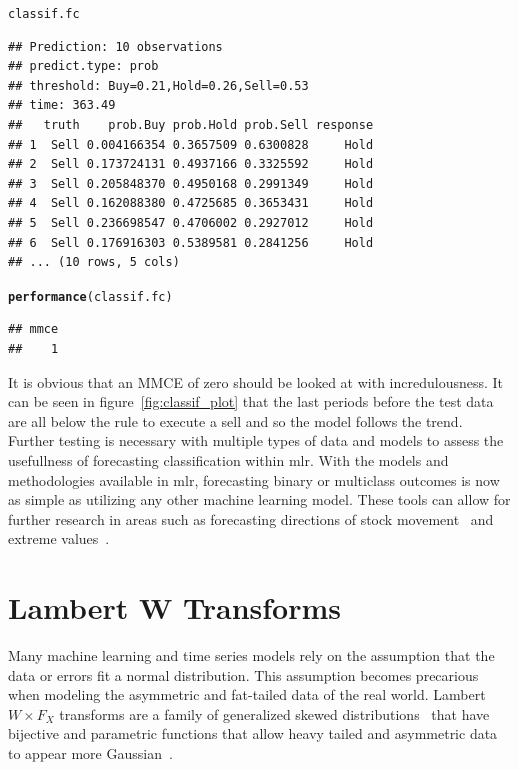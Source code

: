 \documentclass[12pt]{article}\usepackage[]{graphicx}\usepackage[]{color}
\makeatletter
\newcommand{\hlstd}[1]{\textcolor[rgb]{0.345,0.345,0.345}{#1}}%
\newcommand{\hlkwd}[1]{\textcolor[rgb]{0.737,0.353,0.396}{\textbf{#1}}}%
\newenvironment{kframe}{%
 \def\at@end@of@kframe{}%
 \ifinner\ifhmode%
  \def\at@end@of@kframe{\end{minipage}}%
  \begin{minipage}{\columnwidth}%
 \fi\fi%
 \def\FrameCommand##1{\hskip\@totalleftmargin \hskip-\fboxsep
 \colorbox{shadecolor}{##1}\hskip-\fboxsep
     \hskip-\linewidth \hskip-\@totalleftmargin \hskip\columnwidth}%
 \MakeFramed {\advance\hsize-\width
   \@totalleftmargin\z@ \linewidth\hsize
   \@setminipage}}%
 {\par\unskip\endMakeFramed%
 \at@end@of@kframe}
\newenvironment{knitrout}{}{} %
\theoremstyle{definition}
\newcommand{\pkg}[1]{{\fontseries{b}\selectfont #1}}
\makeatother
\begin{document}
\begin{knitrout}
\color{fgcolor}\begin{kframe}
\begin{alltt}
\hlstd{classif.fc}
\end{alltt}
\begin{verbatim}
## Prediction: 10 observations
## predict.type: prob
## threshold: Buy=0.21,Hold=0.26,Sell=0.53
## time: 363.49
##   truth    prob.Buy prob.Hold prob.Sell response
## 1  Sell 0.004166354 0.3657509 0.6300828     Hold
## 2  Sell 0.173724131 0.4937166 0.3325592     Hold
## 3  Sell 0.205848370 0.4950168 0.2991349     Hold
## 4  Sell 0.162088380 0.4725685 0.3653431     Hold
## 5  Sell 0.236698547 0.4706002 0.2927012     Hold
## 6  Sell 0.176916303 0.5389581 0.2841256     Hold
## ... (10 rows, 5 cols)
\end{verbatim}
\begin{alltt}
\hlkwd{performance}\hlstd{(classif.fc)}
\end{alltt}
\begin{verbatim}
## mmce 
##    1
\end{verbatim}
\end{kframe}
\end{knitrout}
\doublespacing

It is obvious that an MMCE of zero should be looked at with incredulousness. It can be seen in figure~\ref{fig:classif_plot} that the last periods before the test data are all below the rule to execute a sell and so the model follows the trend. Further testing is necessary with multiple types of data and models to assess the usefullness of forecasting classification within \pkg{mlr}. With the models and methodologies available in \pkg{mlr}, forecasting binary or multiclass outcomes is now as simple as utilizing any other machine learning model. These tools can allow for further research in areas such as forecasting directions of stock movement~\cite{markClassifStock} and extreme values~\cite{Chen2015UsingEV}.

\section{Lambert W Transforms}
\label{sec:lambert}
Many machine learning and time series models rely on the assumption that the data or errors fit a normal distribution. This assumption becomes precarious when modeling the asymmetric and fat-tailed data of the real world. Lambert $W\times F_X$ transforms are a family of generalized skewed distributions~\cite{LambertGeneral} that have bijective and parametric functions that allow heavy tailed and asymmetric data to appear more Gaussian~\cite{GaussLam}.
\end{document}

